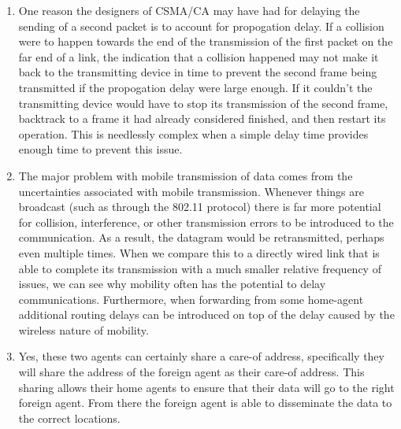 \begin{enumerate}
    \item One reason the designers of CSMA/CA may have had for delaying the sending of a second packet is to account for propogation delay. If a collision were to happen towards the end of the transmission of the first packet on the far end of a link, the indication that a collision happened may not make it back to the transmitting device in time to prevent the second frame being transmitted if the propogation delay were large enough. If it couldn't the transmitting device would have to stop its transmission of the second frame, backtrack to a frame it had already considered finished, and then restart its operation. This is needlessly complex when a simple delay time provides enough time to prevent this issue.

    \newpage

    \item  The major problem with mobile transmission of data comes from the uncertainties associated with mobile transmission. Whenever things are broadcast (such as through the 802.11 protocol) there is far more potential for collision, interference, or other transmission errors to be introduced to the communication. As a result, the datagram would be retransmitted, perhaps even multiple times. When we compare this to a directly wired link that is able to complete its transmission with a much smaller relative frequency of issues, we can see why mobility often has the potential to delay communications. Furthermore, when forwarding from some home-agent additional routing delays can be introduced on top of the delay caused by the wireless nature of mobility.

    \item Yes, these two agents can certainly share a care-of address, specifically they will share the address of the foreign agent as their care-of address. This sharing allows their home agents to ensure that their data will go to the right foreign agent. From there the foreign agent is able to disseminate the data to the correct locations.
\end{enumerate}

